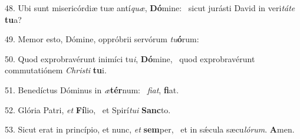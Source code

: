 48. Ubi sunt misericórdiæ tuæ antí\textit{quæ}, \textbf{Dó}mine: \ast\  sicut jurásti David in veri\textit{tá}\textit{te} \textbf{tu}a?\

49. Memor esto, Dómine, oppróbrii servórum \textit{tu}\textbf{ó}rum: \ast\  \

50. Quod exprobravérunt inimíci tu\textit{i}, \textbf{Dó}mine, \ast\  quod exprobravérunt commutatiónem \textit{Chris}\textit{ti} \textbf{tu}i.\

51. Benedíctus Dóminus in \textit{æ}\textbf{tér}num: \ast\  \textit{fi}\textit{at}, \textbf{fi}at.\

52. Glória Patri, \textit{et} \textbf{Fí}lio, \ast\  et Spirí\textit{tu}\textit{i} \textbf{Sanc}to.\

53. Sicut erat in princípio, et nunc, \textit{et} \textbf{sem}per, \ast\  et in sǽcula sæcu\textit{ló}\textit{rum}. \textbf{A}men.\

